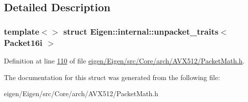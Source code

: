 \subsection{Detailed Description}
\subsubsection*{template$<$$>$\newline
struct Eigen\+::internal\+::unpacket\+\_\+traits$<$ Packet16i $>$}



Definition at line \hyperlink{eigen_2_eigen_2src_2_core_2arch_2_a_v_x512_2_packet_math_8h_source_l00110}{110} of file \hyperlink{eigen_2_eigen_2src_2_core_2arch_2_a_v_x512_2_packet_math_8h_source}{eigen/\+Eigen/src/\+Core/arch/\+A\+V\+X512/\+Packet\+Math.\+h}.



The documentation for this struct was generated from the following file\+:\begin{DoxyCompactItemize}
\item 
eigen/\+Eigen/src/\+Core/arch/\+A\+V\+X512/\+Packet\+Math.\+h\end{DoxyCompactItemize}
